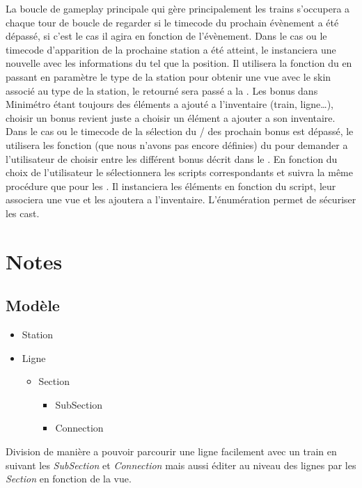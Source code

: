 \documentclass[report, backcover, french, nodocumentinfo]{upmethodology-document}
\begin{document}
				La boucle de gameplay principale qui gère principalement les trains s'occupera a chaque tour de boucle de regarder si le timecode du prochain évènement a été dépassé, si c'est le cas il agira en fonction de l'évènement.
				Dans le cas ou le timecode d'apparition de la prochaine station a été atteint, le  instanciera une nouvelle  avec les informations du  tel que la position. Il utilisera la fonction  du  en passant en paramètre le type de la station pour obtenir une vue avec le skin associé au type de la station, le  retourné sera passé a la .
				Les bonus dans Minimétro étant toujours des éléments a ajouté a l'inventaire (train, ligne\ldots), choisir un bonus revient juste a choisir un élément a ajouter a son inventaire. Dans le cas ou le timecode de la sélection du / des prochain bonus est dépassé, le  utilisera les fonction (que nous n'avons pas encore définies) du  pour demander a l'utilisateur de choisir entre les différent bonus décrit dans le . En fonction du choix de l'utilisateur le  sélectionnera les scripts correspondants et suivra la même procédure que pour les . Il instanciera les éléments en fonction du script, leur associera une vue et les ajoutera a l'inventaire. L'énumération  permet de sécuriser les cast.
	\chapter{Notes}
		\section{Modèle}
			\begin{itemize}
				\item Station
				\item Ligne
					\begin{itemize}
						\item Section
							\begin{itemize}
								\item SubSection
								\item Connection
							\end{itemize}
					\end{itemize}
			\end{itemize}
			Division de manière a pouvoir parcourir une ligne facilement avec un train en suivant les \textit{SubSection} et \textit{Connection} mais aussi éditer au niveau des lignes par les \textit{Section} en fonction de la vue.
\end{document}
